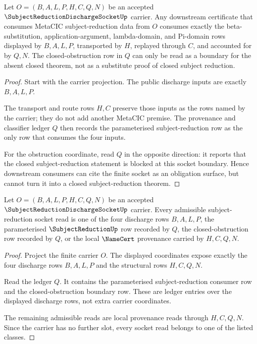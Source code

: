 \begin{theorem}
\label{thm:subject-reduction-discharge-socket-obligation-consumption}
Let $O=(B,A,L,P,H,C,Q,N)$ be an accepted $\SubjectReductionDischargeSocketUp$ carrier. Any downstream certificate that consumes MetaCIC subject-reduction data from $O$ consumes exactly the beta-substitution, application-argument, lambda-domain, and Pi-domain rows displayed by $B,A,L,P$, transported by $H$, replayed through $C$, and accounted for by $Q,N$. The closed-obstruction row in $Q$ can only be read as a boundary for the absent closed theorem, not as a substitute proof of closed subject reduction.
\end{theorem}
\begin{proof}
Start with the carrier projection. The public discharge inputs are exactly $B,A,L,P$.

The transport and route rows $H,C$ preserve those inputs as the rows named by the carrier; they do not add another MetaCIC premise. The provenance and classifier ledger $Q$ then records the parameterised subject-reduction row as the only row that consumes the four inputs.

For the obstruction coordinate, read $Q$ in the opposite direction: it reports that the closed subject-reduction statement is blocked at this socket boundary. Hence downstream consumers can cite the finite socket as an obligation surface, but cannot turn it into a closed subject-reduction theorem.
\end{proof}

\begin{theorem}
\label{thm:subject-reduction-discharge-socket-row-exhaustion}
Let $O=(B,A,L,P,H,C,Q,N)$ be an accepted $\SubjectReductionDischargeSocketUp$ carrier. Every admissible subject-reduction socket read is one of the four discharge rows $B,A,L,P$, the parameterised $\SubjectReductionUp$ row recorded by $Q$, the closed-obstruction row recorded by $Q$, or the local $\NameCert$ provenance carried by $H,C,Q,N$.
\end{theorem}
\begin{proof}
Project the finite carrier $O$. The displayed coordinates expose exactly the four discharge rows $B,A,L,P$ and the structural rows $H,C,Q,N$.

Read the ledger $Q$. It contains the parameterised subject-reduction consumer row and the closed-obstruction boundary row. These are ledger entries over the displayed discharge rows, not extra carrier coordinates.

The remaining admissible reads are local provenance reads through $H,C,Q,N$. Since the carrier has no further slot, every socket read belongs to one of the listed classes.
\end{proof}

